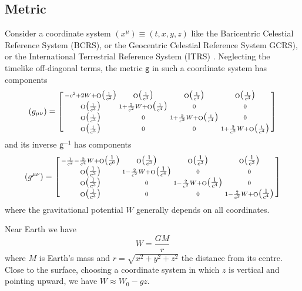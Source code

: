 \documentclass[a4paper,12pt,%
onecolumn,oneside,article,%
british%
]{memoir}
\theoremstyle{remark}
\theoremstyle{innote}
\newcommand*{\mathte}[1]{\bm{\mathsf{#1}}}
\DeclareMathOperator{\Ord}{O}%
\renewcommand*{\|}[1][]{\nonscript\:#1\vert\nonscript\:\mathopen{}}
\newcommand*{\sect}{\S}%
\newcommand*{\yg}{\mathte{g}}
\newcommand*{\yW}{W}
\newcommand*{\Oc}[1]{\Ord\bigl(\tfrac{1}{c^{#1}}\bigr)}
\begin{document}
\subsection{Metric}
\label{sec:GCRS_metric}

Consider a coordinate system $(x^{\mu}) \equiv (t,x,y,z)$ like the Baricentric Celestial Reference System (BCRS), or the Geocentric Celestial Reference System GCRS), or the International Terrestrial Reference System (ITRS) \autocites{soffeletal2003,petitetal2005}[\sect\,8.1.1]{poissonetal2014}[see also][\sect\,2.3.1.1]{moyer2000}.
Neglecting the timelike off-diagonal terms, the metric $\yg$ in such a coordinate system has components
\begin{equation}
  \label{eq:metric_GCRS}
  (g_{\mu\nu}) =
  \begin{bsmallmatrix}
    -c^{2} + 2 \yW + \Ord\bigl(\frac{1}{c^{2}}\bigr) &
    \Ord\bigl(\frac{1}{c^{3}}\bigr) &
    \Ord\bigl(\frac{1}{c^{3}}\bigr) &
    \Ord\bigl(\frac{1}{c^{3}}\bigr)
    \\
    \Ord\bigl(\frac{1}{c^{3}}\bigr) &
    1 + \frac{2}{c^{2}} \yW + \Ord\bigl(\frac{1}{c^{4}}\bigr) &
    0 &
    0
    \\
    \Ord\bigl(\frac{1}{c^{3}}\bigr) &
    0 &
    1 + \frac{2}{c^{2}} \yW + \Ord\bigl(\frac{1}{c^{4}}\bigr) &
    0
    \\
    \Ord\bigl(\frac{1}{c^{3}}\bigr) &
    0 &
    0 &
    1 + \frac{2}{c^{2}} \yW + \Ord\bigl(\frac{1}{c^{4}}\bigr)
  \end{bsmallmatrix}
\end{equation}
and its inverse $\yg^{-1}$ has components
\begin{equation}
  \label{eq:inv_metric_GCRS}
  (g^{\mu\nu}) =
  \begin{bsmallmatrix}
    -\frac{1}{c^{2}} - \frac{2}{c^{4}} \yW + \Oc{6} &
    \Oc{3} &
    \Oc{3} &
    \Oc{3}
    \\
    \Oc{3} &
    1 - \frac{2}{c^{2}} \yW + \Oc{4} &
    0 &
    0
    \\
    \Oc{3} &
    0 &
    1 - \frac{2}{c^{2}} \yW + \Oc{4} &
    0
    \\
    \Oc{3} &
    0 &
    0 &
    1 - \frac{2}{c^{2}} \yW + \Oc{4}
  \end{bsmallmatrix}
\end{equation}
where the gravitational potential $\yW$ generally depends on all coordinates.

Near Earth we have
\begin{equation}
  \label{eq:grav_potential_GCRS}
  \yW = \frac{G M}{r}
\end{equation}
where $M$ is Earth's mass and $r=\sqrt{x^{2}+y^{2}+z^{2}}$ the distance from its centre. Close to the surface, choosing a coordinate system in which $z$ is vertical and pointing upward, we have $\yW\approx \yW_{0} - g z$.
\end{document}
